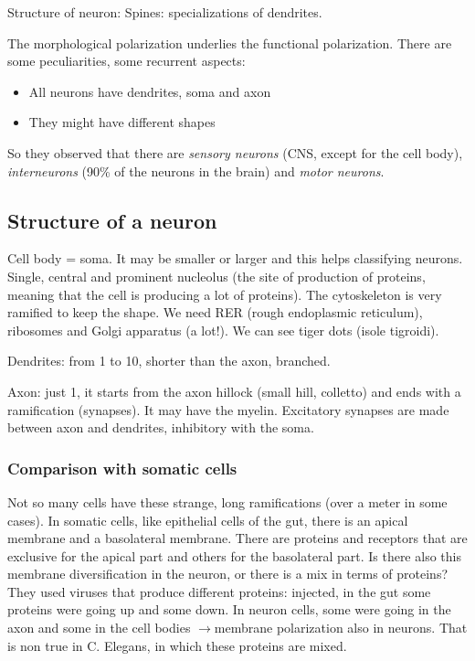 \documentclass[a4paper, 12pt]{book}
\newcommand{\lfreccia}{\ensuremath{\longrightarrow}}
\begin{document}
Structure of neuron: 
Spines: specializations of dendrites. 

The morphological polarization underlies the functional polarization. There are some peculiarities, some recurrent aspects:
\begin{itemize}
\item{All neurons have dendrites, soma and axon}
\item{They might have different shapes}
\end{itemize}
So they observed that there are \emph{sensory neurons} (CNS, except for the cell body), \emph{interneurons} (90\% of the neurons in the brain) and \emph{motor neurons}. 

\subsection{Structure of a neuron}
Cell body = soma. It may be smaller or larger and this helps classifying neurons. Single, central and prominent nucleolus (the site of production of proteins, meaning that the cell is producing a lot of proteins). The cytoskeleton is very ramified to keep the shape. We need RER (rough endoplasmic reticulum), ribosomes and Golgi apparatus (a lot!). We can see tiger dots (isole tigroidi). 

Dendrites: from 1 to 10, shorter than the axon, branched.

Axon: just 1, it starts from the axon hillock (small hill, colletto) and ends with a ramification (synapses). It may have the myelin. Excitatory synapses are made between axon and dendrites, inhibitory with the soma.

\subsubsection{Comparison with somatic cells}
Not so many cells have these strange, long ramifications (over a meter in some cases). In somatic cells, like epithelial cells of the gut, there is an apical membrane and a basolateral membrane. There are proteins and receptors that are exclusive for the apical part and others for the basolateral part. Is there also this membrane diversification in the neuron, or there is a mix in terms of proteins? They used viruses that produce different proteins: injected, in the gut some proteins were going up and some down. In neuron cells, some were going in the axon and some in the cell bodies \lfreccia membrane polarization also in neurons. That is non true in C. Elegans, in which these proteins are mixed.
\end{document}
